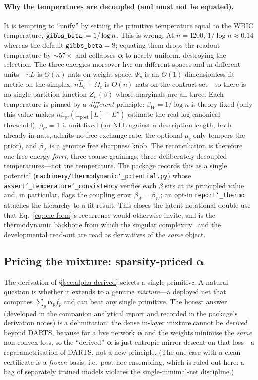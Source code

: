 \documentclass[11pt]{article}
\newcommand{\allowbreakhere}{\discretionary{}{}{}}
\newcommand{\code}[1]{\texttt{\def\_{\char`_\allowbreakhere}#1}}
\newcommand{\alphapar}{\bm{\alpha}}
\begin{document}
\paragraph{Why the temperatures are decoupled (and must not be equated).} It is tempting to ``unify'' by setting the primitive temperature equal to the WBIC temperature, $\code{gibbs\_beta}:=1/\log n$. This is wrong. At $n=1200$, $1/\log n\approx0.14$ whereas the default $\code{gibbs\_beta}=8$; equating them drops the readout temperature by $\sim\!57\times$ and collapses $\alphapar$ to nearly uniform, destroying the selection. The three energies moreover live on different spaces and in different units---$n L$ is $O(n)$ nats on weight space, $\Psi_p$ is an $O(1)$ dimensionless fit metric on the simplex, $n\hat L_c+\Omega_c$ is $O(n)$ nats on the contract set---so there is no single partition function $Z_n(\beta)$ whose marginals are all three. Each temperature is pinned by a \emph{different} principle: $\beta_W=1/\log n$ is theory-fixed (only this value makes $n\beta_W(\mathbb{E}_{\mathrm{post}}[L]-L^\star)$ estimate the real log canonical threshold), $\beta_C=1$ is unit-fixed (an NLL against a description length, both already in nats, admits no free exchange rate; the optional $\mu_c$ only tempers the prior), and $\beta_A$ is a genuine free sharpness knob. The reconciliation is therefore one free-energy \emph{form}, three coarse-grainings, three deliberately decoupled temperatures---not one temperature. The package records this as a single potential (\code{machinery/thermodynamic\_potential.py}) whose \code{assert\_temperature\_consistency} verifies each $\beta$ sits at its principled value and, in particular, flags the coupling error $\beta_A=\beta_W$; an opt-in \code{report\_thermo} attaches the hierarchy to a fit result. This closes the latent notational double-use that Eq.~\eqref{eq:one-form}'s recurrence would otherwise invite, and is the thermodynamic backbone from which the singular complexity~\cite{lau2023llc} and the developmental read-out are read as derivatives of the \emph{same} object.


\subsection{Pricing the mixture: sparsity-priced \texorpdfstring{$\alphapar$}{alpha}}
\label{sec:sparsity-priced}

The derivation of \S\ref{sec:alpha-derived} selects a single primitive. A natural question is whether it
extends to a genuine \emph{mixture}---a deployed net that computes $\sum_p\alphapar_p f_p$ and can beat
any single primitive. The honest answer (developed in the companion analytical report and recorded in the
package's derivation notes) is a delimitation: the dense in-layer mixture cannot be \emph{derived} beyond
DARTS, because for a live network $\alphapar$ and the weights minimise the \emph{same} non-convex loss, so
the ``derived'' $\alphapar$ is just entropic mirror descent on that loss---a reparametrisation of DARTS,
not a new principle. (The one case with a clean certificate is a \emph{frozen} basis, i.e.\ post-hoc
ensembling, which is ruled out here: a bag of separately trained models violates the single-minimal-net
discipline.)
\end{document}
